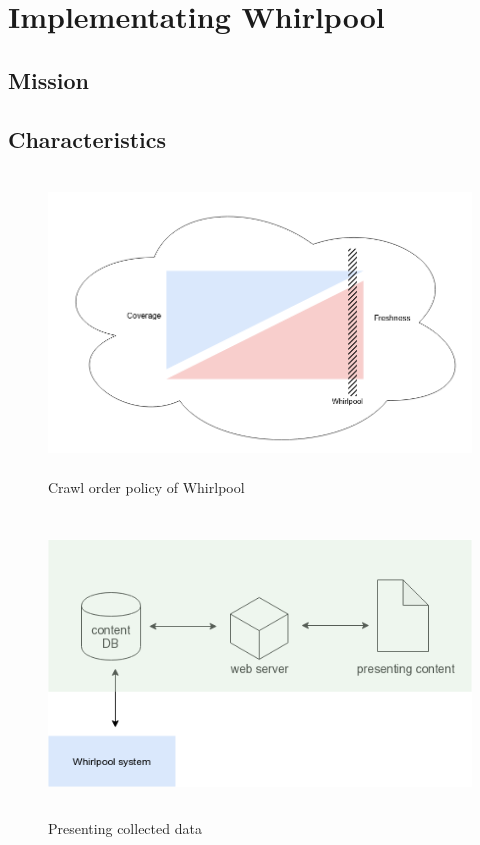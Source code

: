 \chapter{Implementating Whirlpool}\label{implwhirlpool}
\section{Mission}
\section{Characteristics}
\begin{figure}[h!]
  \centering
  \includegraphics[width=15cm,height=8cm,keepaspectratio]{../media/crawler/whirlpool-crawl-order.png}
  \caption{Crawl order policy of Whirlpool}
  \label{fig:whrlplcrawlorder}
\end{figure}

\begin{figure}[h!]
  \centering
  \includegraphics[width=13cm,height=8cm,keepaspectratio]{../media/crawler/data-collection.png}
  \caption{Presenting collected data}
  \label{fig:datacollect}
\end{figure}

\pagebreak